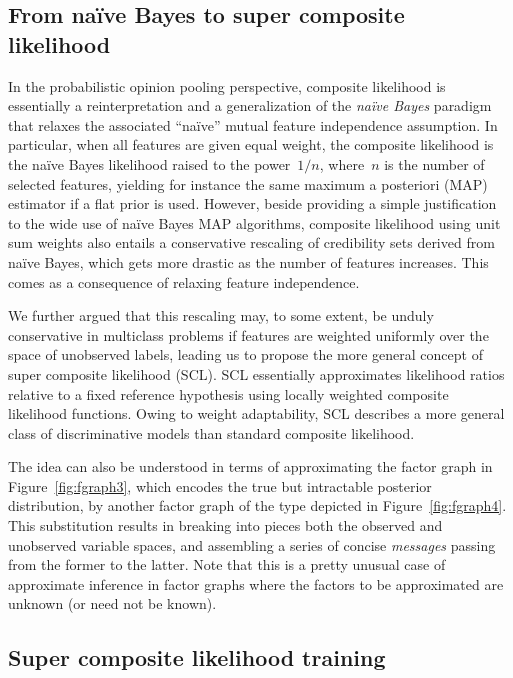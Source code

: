 \documentclass[english]{scrartcl}
\begin{document}
\subsection{From na\"ive Bayes to super composite likelihood}

In the probabilistic opinion pooling perspective, composite likelihood is essentially a reinterpretation and a generalization of the {\em na\"ive Bayes} paradigm that relaxes the associated ``na\"ive'' mutual feature independence assumption. In particular, when all features are given equal weight, the composite likelihood is the na\"ive Bayes likelihood raised to the power~$1/n$, where~$n$ is the number of selected features, yielding for instance the same maximum a posteriori (MAP) estimator if a flat prior is used. However, beside providing a simple justification to the wide use of na\"ive Bayes MAP algorithms,  composite likelihood using unit sum weights also entails a conservative rescaling of credibility sets derived from na\"ive Bayes, which gets more drastic as the number of features increases. This comes as a consequence of relaxing feature independence.

We further argued that this rescaling may, to some extent, be unduly conservative in multiclass problems if features are weighted uniformly over the space of unobserved labels, leading us to propose the more general concept of super composite likelihood (SCL). SCL essentially approximates likelihood ratios relative to a fixed reference hypothesis using locally weighted composite likelihood functions. Owing to weight adaptability, SCL describes a more general class of discriminative models than standard composite likelihood. 

The idea can also be understood in terms of approximating the factor graph in Figure~\ref{fig:fgraph3}, which encodes the true but intractable posterior distribution, by another factor graph of the type depicted in Figure~\ref{fig:fgraph4}. This substitution results in breaking into pieces both the observed and unobserved variable spaces, and assembling a series of concise {\em messages} passing from the former to the latter. Note that this is a pretty unusual case of approximate inference in factor graphs where the factors to be approximated are unknown (or need not be known).

\subsection{Super composite likelihood training}
\end{document}
